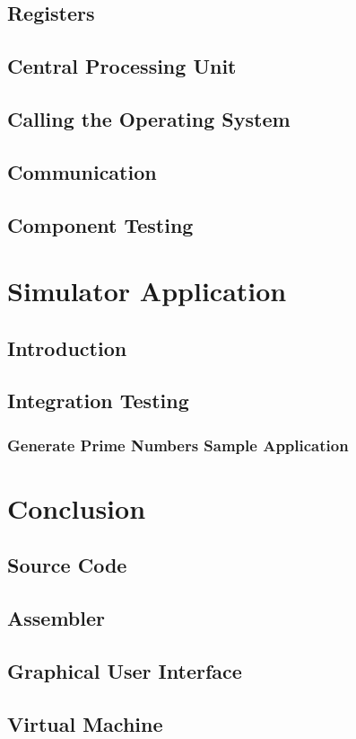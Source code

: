 \documentclass[a4paper,11pt]{report}
\begin{document}
\section{Registers}
\section{Central Processing Unit}
\section{Calling the Operating System}
\section{Communication}
\section{Component Testing}
\chapter{Simulator Application}
\section{Introduction}
\section{Integration Testing}
\subsection{Generate Prime Numbers Sample Application}
\chapter*{Conclusion}
\nocite{*}


\begin{appendices}
\noappendicestocpagenum
\addappheadtotoc 
\chapter{Source Code}
\section{Assembler}
\section{Graphical User Interface}
\section{Virtual Machine}
\end{appendices}
\end{document}
